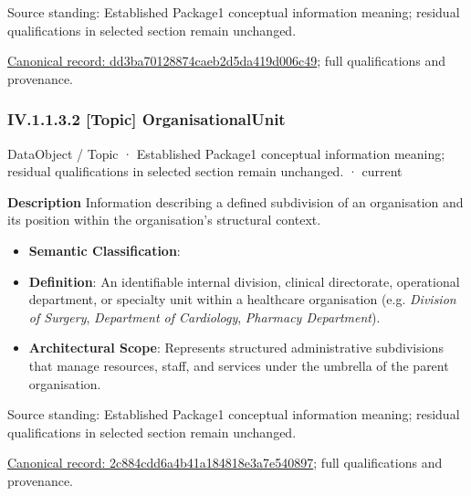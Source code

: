 Source standing: Established Package1 conceptual information meaning; residual qualifications in selected section remain unchanged.


{\footnotesize \href{../../../../continuum/application/data-object/topic/dd3ba70128874caeb2d5da419d006c49.md}{Canonical record: dd3ba70128874caeb2d5da419d006c49}; full qualifications and provenance.}\par
\subsubsection*{IV.1.1.3.2 [Topic] OrganisationalUnit}
\label{navigation:IV.1.1.3.2}

\label{element:2c884cdd6a4b41a184818e3a7e540897}
{\small DataObject / Topic · Established Package1 conceptual information meaning; residual qualifications in selected section remain unchanged. · current}\par

\textbf{Description}
Information describing a defined subdivision of an organisation and its position within the organisation's structural context.



\begin{itemize}


\item \textbf{Semantic Classification}: \texttt{}

\item \textbf{Definition}: An identifiable internal division, clinical directorate, operational department, or specialty unit within a healthcare organisation (e.g. \emph{Division of Surgery}, \emph{Department of Cardiology}, \emph{Pharmacy Department}).

\item \textbf{Architectural Scope}: Represents structured administrative subdivisions that manage resources, staff, and services under the umbrella of the parent organisation.

\end{itemize}


Source standing: Established Package1 conceptual information meaning; residual qualifications in selected section remain unchanged.


{\footnotesize \href{../../../../continuum/application/data-object/topic/2c884cdd6a4b41a184818e3a7e540897.md}{Canonical record: 2c884cdd6a4b41a184818e3a7e540897}; full qualifications and provenance.}\par
